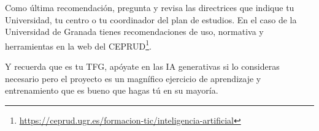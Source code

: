 

Como última recomendación, pregunta y revisa las directrices que indique tu Universidad, tu centro o tu coordinador del plan de estudios. En el caso de la Universidad de Granada tienes recomendaciones de uso, normativa y herramientas en la web del CEPRUD\footnote{\url{https://ceprud.ugr.es/formacion-tic/inteligencia-artificial}}.

Y recuerda que es tu TFG, apóyate en las IA generativas si lo consideras necesario pero el proyecto es un magnífico ejercicio de aprendizaje y entrenamiento que es bueno que hagas tú en su mayoría.







